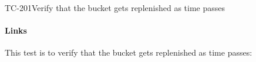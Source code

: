 \begin{testcase}{TC-201}{Verify that the bucket gets replenished as time passes}
\paragraph{Links} 

    This test is to verify that the bucket gets replenished as time passes:
    \automatedtest

\end{testcase}